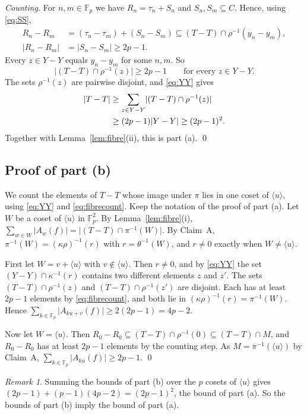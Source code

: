 \documentclass[11pt]{amsart}
\theoremstyle{definition}\newtheorem{definition}[theorem]{Definition}
\theoremstyle{remark}\newtheorem{remark}[theorem]{Remark}
\newcommand{\F}{\mathbb{F}}
\newcommand{\abs}[1]{\lvert #1\rvert}
\newcommand{\gen}[1]{\langle #1\rangle}
\begin{document}
\emph{Counting.}
For \(n,m\in\F_p\) we have \(R_n=\tau_n+S_n\) and \(S_n,S_m\subseteq C\).
Hence, using \eqref{eq:SS},
\begin{align*}
R_n-R_m&=(\tau_n-\tau_m)+(S_n-S_m)\subseteq(T-T)\cap\rho^{-1}(y_n-y_m),\\
\abs{R_n-R_m}&=\abs{S_n-S_m}\ge2p-1 .
\end{align*}
Every \(z\in Y-Y\) equals \(y_n-y_m\) for some \(n,m\).
So
\begin{equation}\label{eq:fibrecount}
\abs{(T-T)\cap\rho^{-1}(z)}\ge2p-1\qquad\text{for every } z\in Y-Y .
\end{equation}
The sets \(\rho^{-1}(z)\) are pairwise disjoint, and \eqref{eq:YY} gives
\begin{align}
\abs{T-T}&\ge\sum_{z\in Y-Y}\abs{(T-T)\cap\rho^{-1}(z)}\notag\\
&\ge(2p-1)\abs{Y-Y}\ge(2p-1)^2 .\label{eq:count}
\end{align}
Together with Lemma~\ref{lem:fibre}(ii), this is part (a).
\qed

\subsection{Proof of part (b)}
We count the elements of \(T-T\) whose image under \(\pi\) lies in one coset of \(\gen{u}\), using \eqref{eq:YY} and \eqref{eq:fibrecount}.
Keep the notation of the proof of part (a).
Let \(W\) be a coset of \(\gen{u}\) in \(\F_p^2\).
By Lemma~\ref{lem:fibre}(i), \(\sum_{w\in W}\abs{A_w(f)}=\abs{(T-T)\cap\pi^{-1}(W)}\).
By Claim~A, \(\pi^{-1}(W)=(\kappa\rho)^{-1}(r)\) with \(r=\theta^{-1}(W)\), and \(r\ne0\) exactly when \(W\ne\gen{u}\).

First let \(W=v+\gen{u}\) with \(v\notin\gen{u}\).
Then \(r\ne0\), and by \eqref{eq:YY} the set \((Y-Y)\cap\kappa^{-1}(r)\) contains two different elements \(z\) and \(z'\).
The sets \((T-T)\cap\rho^{-1}(z)\) and \((T-T)\cap\rho^{-1}(z')\) are disjoint.
Each has at least \(2p-1\) elements by \eqref{eq:fibrecount}, and both lie in \((\kappa\rho)^{-1}(r)=\pi^{-1}(W)\).
Hence \(\sum_{k\in\F_p}\abs{A_{ku+v}(f)}\ge2(2p-1)=4p-2\).

Now let \(W=\gen{u}\).
Then \(R_0-R_0\subseteq(T-T)\cap\rho^{-1}(0)\subseteq(T-T)\cap M\), and \(R_0-R_0\) has at least \(2p-1\) elements by the counting step.
As \(M=\pi^{-1}(\gen{u})\) by Claim~A, \(\sum_{k\in\F_p}\abs{A_{ku}(f)}\ge2p-1\).
\qed

\begin{remark}
Summing the bounds of part (b) over the \(p\) cosets of \(\gen{u}\) gives \((2p-1)+(p-1)(4p-2)=(2p-1)^2\), the bound of part (a).
So the bounds of part (b) imply the bound of part (a).
\end{remark}
\end{document}
